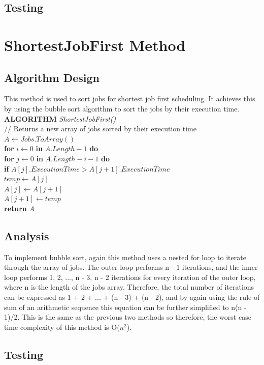 \documentclass[12pt,a4paper]{article}
\begin{document}
		\subsection{Testing}
	\section{ShortestJobFirst Method}
		\subsection{Algorithm Design}
			This method is used to sort jobs for shortest job first scheduling. It achieves this by 
			using the bubble sort algorithm to sort the jobs by their execution time.\\
			
			\textbf{ALGORITHM} \textit{ShortestJobFirst()}\\
			\null\hspace{1cm}// Returns a new array of jobs sorted by their execution time\\
			\null\hspace{1cm}\textit{$A \gets Jobs.ToArray()$}\\
			\null\hspace{1cm}\textbf{for} \textit{$i \gets 0$} \textbf{in} \textit{$A.Length - 1$} \textbf{do}\\
			\null\hspace{2cm}\textbf{for} \textit{$j \gets 0$} \textbf{in} \textit{$A.Length - i - 1$} \textbf{do}\\
			\null\hspace{3cm}\textbf{if} \textit{$A[j].ExecutionTime > A[j + 1].ExecutionTime$}\\
			\null\hspace{4cm}\textit{$temp \gets A[j]$}\\
			\null\hspace{4cm}\textit{$A[j] \gets A[j + 1]$}\\
			\null\hspace{4cm}\textit{$A[j + 1] \gets temp$}\\
			\null\hspace{1cm}\textbf{return} \textit{A}\\

		\subsection{Analysis}
			To implement bubble sort, again this method uses a nested for loop to iterate through the array of 
			jobs. The outer loop performs n - 1 iterations, and the inner loop performs 1, 2, ..., n - 3, n - 2 
			iterations for every iteration of the outer loop, where n is the length of the jobs array. Therefore, 
			the total number of iterations can be expressed as 1 + 2 + ... + (n - 3) + (n - 2), and by again 
			using the rule of sum of an arithmetic sequence this equation can be further simplified to n(n - 1)/2. 
			This is the same as the previous two methods so therefore, the worst case time complexity of this 
			method is O($n ^ 2$).\\

		\subsection{Testing}
\end{document}
